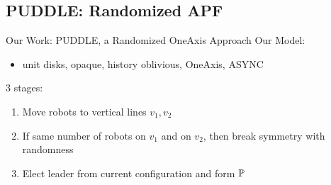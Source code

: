 \documentclass{beamer}
\begin{document}
\subsection{PUDDLE: Randomized APF} 
\begin{frame}{Our Work: PUDDLE, a Randomized OneAxis Approach}
	Our Model:
	\begin{itemize}
		\item unit disks, opaque, history oblivious, OneAxis, ASYNC
	\end{itemize}
	3 stages:
	\begin{enumerate}
		\item Move robots to vertical lines $v_1,v_2$
		\item If same number of robots on $v_1$ and on $v_2$, then break symmetry with randomness
		\item Elect leader from current configuration and form $\mathbb{P}$
	\end{enumerate}
\end{frame}
\end{document}
